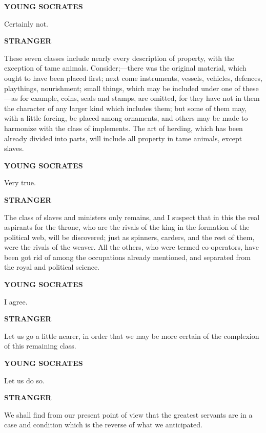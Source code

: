 \documentclass[11pt,letter]{article}
\begin{document}
\par \textbf{YOUNG SOCRATES}
\par   Certainly not.

\par \textbf{STRANGER}
\par   These seven classes include nearly every description of property, with the exception of tame animals. Consider;—there was the original material, which ought to have been placed first; next come instruments, vessels, vehicles, defences, playthings, nourishment; small things, which may be included under one of these—as for example, coins, seals and stamps, are omitted, for they have not in them the character of any larger kind which includes them; but some of them may, with a little forcing, be placed among ornaments, and others may be made to harmonize with the class of implements. The art of herding, which has been already divided into parts, will include all property in tame animals, except slaves.

\par \textbf{YOUNG SOCRATES}
\par   Very true.

\par \textbf{STRANGER}
\par   The class of slaves and ministers only remains, and I suspect that in this the real aspirants for the throne, who are the rivals of the king in the formation of the political web, will be discovered; just as spinners, carders, and the rest of them, were the rivals of the weaver. All the others, who were termed co-operators, have been got rid of among the occupations already mentioned, and separated from the royal and political science.

\par \textbf{YOUNG SOCRATES}
\par   I agree.

\par \textbf{STRANGER}
\par   Let us go a little nearer, in order that we may be more certain of the complexion of this remaining class.

\par \textbf{YOUNG SOCRATES}
\par   Let us do so.

\par \textbf{STRANGER}
\par   We shall find from our present point of view that the greatest servants are in a case and condition which is the reverse of what we anticipated.
\end{document}
